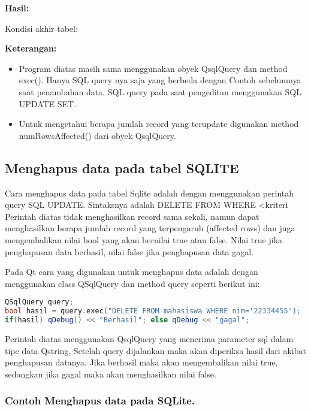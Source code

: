 \textbf{Hasil:}

Kondisi akhir tabel:

\textbf{Keterangan:}

\begin{itemize}

\item
  Program diatas masih sama menggunakan obyek QsqlQuery dan method
  exec(). Hanya SQL query nya saja yang berbeda dengan Contoh sebelumnya
  saat penambahan data. SQL query pada saat pengeditan menggunakan SQL
  UPDATE SET.
\item
  Untuk mengetahui berapa jumlah record yang terupdate digunakan method
  numRowsAffected() dari obyek QsqlQuery.
\end{itemize}

\subsection{Menghapus data pada tabel
SQLITE}\label{menghapus-data-pada-tabel-sqlite}

Cara menghapus data pada tabel Sqlite adalah dengan menggunakan perintah
query SQL UPDATE. Sintaksnya adalah DELETE FROM WHERE \textless{}kriteri
Perintah diatas tidak menghasilkan record sama sekali, namun dapat
menghasilkan berapa jumlah record yang terpengaruh (affected rows) dan
juga mengembalikan nilai bool yang akan bernilai true atau false. Nilai
true jika penghapusan data berhasil, nilai false jika penghapusan data
gagal.

Pada Qt cara yang digunakan untuk menghapus data adalah dengan
menggunakan class QSqlQuery dan method query seperti berikut ini:

\begin{lstlisting}[language=c++, caption=menghapus data adalah dengan menggunakan class QSqlQuery dan method query]
QSqlQuery query;
bool hasil = query.exec("DELETE FROM mahasiswa WHERE nim='22334455');
if(hasil) qDebug() << "Berhasil"; else qDebug << "gagal";
\end{lstlisting}

Perintah diatas menggunakan QsqlQuery yang menerima parameter sql dalam
tipe data Qstring. Setelah query dijalankan maka akan diperiksa hasil
dari akibat penghapusan datanya. Jika berhasil maka akan mengembalikan
nilai true, sedangkan jika gagal maka akan menghasilkan nilai false.

\subsubsection*{Contoh  Menghapus data pada SQLite.}

